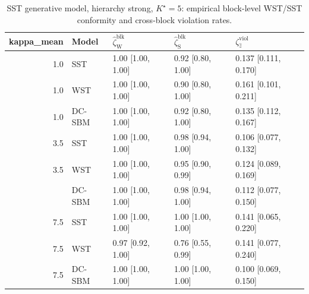 \begin{table}
\centering
\caption{SST generative model, hierarchy strong, $K^\star=5$: empirical block-level WST/SST conformity and cross-block violation rates.}
\centering
\begin{tabular}[t]{rllll}
\toprule
kappa_mean & Model & $\widehat\zeta_{\mathrm{W}}^{\mathrm{blk}}$ & $\widehat\zeta_{\mathrm{S}}^{\mathrm{blk}}$ & $\zeta^{\mathrm{viol}}_{\hat z}$\\
\midrule
1.0 & SST & 1.00 [1.00, 1.00] & 0.92 [0.80, 1.00] & 0.137 [0.111, 0.170]\\
1.0 & WST & 1.00 [1.00, 1.00] & 0.90 [0.80, 1.00] & 0.161 [0.101, 0.211]\\
1.0 & DC-SBM & 1.00 [1.00, 1.00] & 0.92 [0.80, 1.00] & 0.135 [0.112, 0.167]\\
3.5 & SST & 1.00 [1.00, 1.00] & 0.98 [0.94, 1.00] & 0.106 [0.077, 0.132]\\
3.5 & WST & 1.00 [1.00, 1.00] & 0.95 [0.90, 0.99] & 0.124 [0.089, 0.169]\\
\addlinespace
3.5 & DC-SBM & 1.00 [1.00, 1.00] & 0.98 [0.94, 1.00] & 0.112 [0.077, 0.150]\\
7.5 & SST & 1.00 [1.00, 1.00] & 1.00 [1.00, 1.00] & 0.141 [0.065, 0.220]\\
7.5 & WST & 0.97 [0.92, 1.00] & 0.76 [0.55, 0.99] & 0.141 [0.077, 0.240]\\
7.5 & DC-SBM & 1.00 [1.00, 1.00] & 1.00 [1.00, 1.00] & 0.100 [0.069, 0.150]\\
\bottomrule
\end{tabular}
\end{table}

